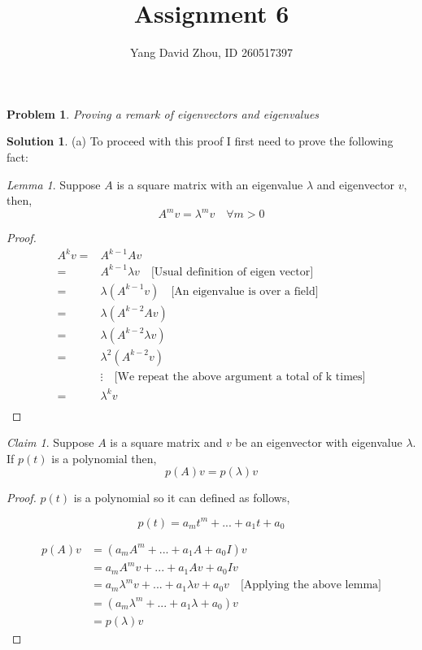 \documentclass{article}
\newtheorem{problem}{Problem}
\theoremstyle{definition}
\newtheorem*{solution}{Solution}
\theoremstyle{remark}
\newtheorem*{theorem}{Claim}
\newtheorem*{lemma}{Lemma}
\begin{document}
 \title{Assignment 6} 

\author{Yang David Zhou, ID 260517397} 
\date{}
\maketitle

\begin{problem}

Proving a remark of eigenvectors and eigenvalues

\end{problem}

\begin{solution}

(a) To proceed with this proof I first need to prove the following fact:

\begin{lemma}
Suppose $A$ is a square matrix with an eigenvalue $\lambda$ and eigenvector $v$, then,
\[A^mv=\lambda^mv\quad\forall m>0\]
\end{lemma}
\begin{proof}
\begin{align*}
A^kv = & A^{k-1}Av \\
 = & A^{k-1}\lambda v \quad \text{[Usual definition of eigen vector]} \\
 = & \lambda (A^{k-1}v) \quad \text{[An eigenvalue is over a field]} \\
 = & \lambda (A^{k-2}Av) \\
 = & \lambda (A^{k-2}\lambda v) \\
 = & \lambda^2 (A^{k-2}v) \\
& \vdots \quad \text{[We repeat the above argument a total of k times]}\\
 = & \lambda^k v \\
\end{align*}
\end{proof}
\begin{theorem}
Suppose $A$ is a square matrix and $v$ be an eigenvector with eigenvalue $\lambda$.
If $p(t)$ is a polynomial then,
\[p(A)v=p(\lambda)v\]
\end{theorem}
\begin{proof}
$p(t)$ is a polynomial so it can defined as follows,

\[p(t)=a_mt^m+...+a_1t+a_0\]

\begin{align*}
p(A)v & = (a_mA^m+...+a_1A+a_0I)v \\
& = a_mA^mv+...+a_1Av+a_0Iv \\
& = a_m\lambda^mv+...+a_1\lambda v+a_0v \quad \text{[Applying the above lemma]} \\
& = (a_m\lambda^m+...+a_1\lambda +a_0)v \\
& = p(\lambda)v
\end{align*}
\end{proof}


\end{solution}
\end{document}

